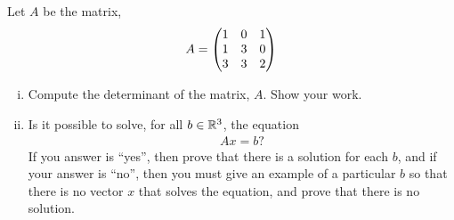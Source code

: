 \begin{question}
    \normalfont

    Let $A$ be the matrix,
    \begin{align*}
        A =
        \begin{pmatrix} 1 &0 &1\\ 1 &3 &0\\ 3 &3 &2 \end{pmatrix}
    \end{align*}

    \begin{enumerate}[(i)]
        \item Compute the determinant of the matrix, $A$. Show your work.

        \item Is it possible to solve, for all $b\in{\mathbb R}^3$, the equation
              \begin{align*}
                  Ax=b?
              \end{align*}
              If you answer is ``yes'', then prove that there is a solution for each $b$, and if your answer is ``no'', then you must give an example of a particular $b$ so that there is no vector $x$ that solves the equation, and prove that there is no solution.
    \end{enumerate}




\end{question}
